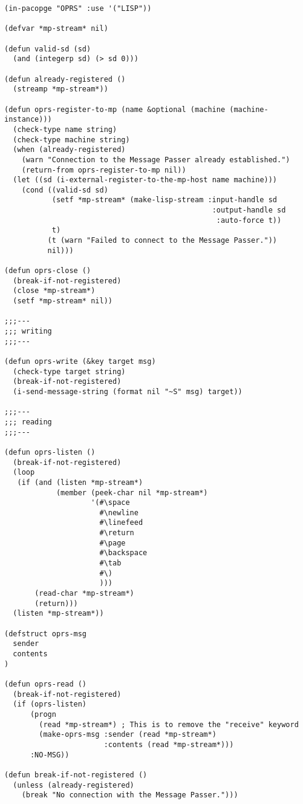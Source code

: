 \begin{verbatim}
(in-pacopge "OPRS" :use '("LISP"))

(defvar *mp-stream* nil)

(defun valid-sd (sd)
  (and (integerp sd) (> sd 0)))

(defun already-registered ()
  (streamp *mp-stream*))

(defun oprs-register-to-mp (name &optional (machine (machine-instance)))
  (check-type name string)
  (check-type machine string)
  (when (already-registered)
    (warn "Connection to the Message Passer already established.")
    (return-from oprs-register-to-mp nil))
  (let ((sd (i-external-register-to-the-mp-host name machine)))
    (cond ((valid-sd sd)
           (setf *mp-stream* (make-lisp-stream :input-handle sd
                                                :output-handle sd
                                                 :auto-force t))
           t)
          (t (warn "Failed to connect to the Message Passer."))
          nil)))

(defun oprs-close ()
  (break-if-not-registered)
  (close *mp-stream*)
  (setf *mp-stream* nil))

;;;---
;;; writing
;;;---

(defun oprs-write (&key target msg)
  (check-type target string)
  (break-if-not-registered)
  (i-send-message-string (format nil "~S" msg) target))

;;;---
;;; reading
;;;---

(defun oprs-listen ()
  (break-if-not-registered)
  (loop
   (if (and (listen *mp-stream*)
            (member (peek-char nil *mp-stream*)
                    '(#\space
                      #\newline
                      #\linefeed
                      #\return
                      #\page
                      #\backspace
                      #\tab
                      #\)
                      )))
       (read-char *mp-stream*)
       (return)))
  (listen *mp-stream*))

(defstruct oprs-msg
  sender
  contents
)

(defun oprs-read ()
  (break-if-not-registered)
  (if (oprs-listen)
      (progn
        (read *mp-stream*) ; This is to remove the "receive" keyword
        (make-oprs-msg :sender (read *mp-stream*)
                       :contents (read *mp-stream*)))
      :NO-MSG))

(defun break-if-not-registered ()
  (unless (already-registered)
    (break "No connection with the Message Passer.")))

\end{verbatim}

